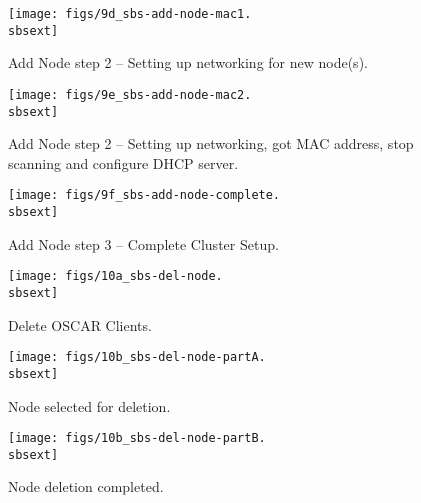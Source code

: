\begin{figure}[htbp]
  \begin{center}
    \centerline{\texttt{[image: figs/9d\_sbs-add-node-mac1.\\sbsext]}}
    \caption{Add Node step 2 -- Setting up networking for new node(s).}
    \label{fig:sbs-add-node1-setup-network}
  \end{center}
\end{figure}

%
\begin{figure}[htbp]
  \begin{center}
    \centerline{\texttt{[image: figs/9e\_sbs-add-node-mac2.\\sbsext]}}
    \caption{Add Node step 2 -- Setting up networking, got MAC address, stop scanning and configure DHCP server.}
    \label{fig:sbs-add-node1-setup-network2}
  \end{center}
\end{figure}

\clearpage

\begin{figure}[htbp]
  \begin{center}
    \centerline{\texttt{[image: figs/9f\_sbs-add-node-complete.\\sbsext]}}
    \caption{Add Node step 3 -- Complete Cluster Setup.}
    \label{fig:sbs-add-node1-cluster-setup}
  \end{center}
\end{figure}


\begin{figure}[htbp]
  \begin{center}
    \centerline{\texttt{[image: figs/10a\_sbs-del-node.\\sbsext]}}
    \caption{Delete OSCAR Clients.}
    \label{fig:sbs-del-node1}
  \end{center}
\end{figure}


\begin{figure}[htbp]
  \begin{center}
    \centerline{\texttt{[image: figs/10b\_sbs-del-node-partA.\\sbsext]}}
    \caption{Node selected for deletion.}
    \label{fig:sbs-del-node1-done-partA}
  \end{center}
\end{figure}

\begin{figure}[htbp]
  \begin{center}
    \centerline{\texttt{[image: figs/10b\_sbs-del-node-partB.\\sbsext]}}
    \caption{Node deletion completed.}
    \label{fig:sbs-del-node1-done-partB}
  \end{center}
\end{figure}

